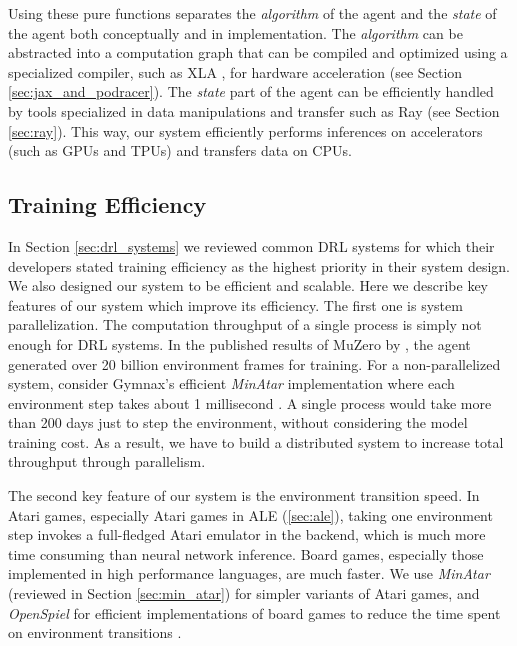 Using these pure functions separates the \textit{algorithm} of the agent and the \textit{state} of the agent both conceptually and in implementation.
The \textit{algorithm} can be abstracted into a computation graph that can be compiled and optimized using a specialized compiler, such as XLA \cite{TensorFlowLargescaleMachine_Abadi.Agarwal.ea_2015}, for hardware acceleration (see Section \ref{sec:jax_and_podracer}).
The \textit{state} part of the agent can be efficiently handled by tools specialized in data manipulations and transfer such as Ray (see Section \ref{sec:ray}).
This way, our system efficiently performs inferences on accelerators (such as GPUs and TPUs) and transfers data on CPUs.

\subsection{Training Efficiency}
In Section \ref{sec:drl_systems} we reviewed common DRL systems for which their developers stated training efficiency as the highest priority in their system design.
We also designed our system to be efficient and scalable.
Here we describe key features of our system which improve its efficiency.
The first one is system parallelization.
The computation throughput of a single process is simply not enough for DRL systems.
In the published results of MuZero by \cite{MasteringAtariGo_Schrittwieser.Antonoglou.ea_2020}, the agent generated over 20 billion environment frames for training.
For a non-parallelized system, consider Gymnax's efficient \textit{MinAtar} implementation where each environment step takes about 1 millisecond \cite{GymnaxJAXbasedReinforcement_RobertTjarkoLange_2022}.
A single process would take more than 200 days just to step the environment, without considering the model training cost.
As a result, we have to build a distributed system to increase total throughput through parallelism.

The second key feature of our system is the environment transition speed.
In Atari games, especially Atari games in ALE (\ref{sec:ale}), taking one environment step invokes a full-fledged Atari emulator in the backend, which is much more time consuming than neural network inference.
Board games, especially those implemented in high performance languages, are much faster.
We use \textit{MinAtar} (reviewed in Section \ref{sec:min_atar}) for simpler variants of Atari games, and \textit{OpenSpiel} for efficient implementations of board games to reduce the time spent on environment transitions \cite{OpenSpielFrameworkReinforcement_Lanctot.Lockhart.ea_2020,MinAtarAtariInspiredTestbed_Young.Tian_2019}.

